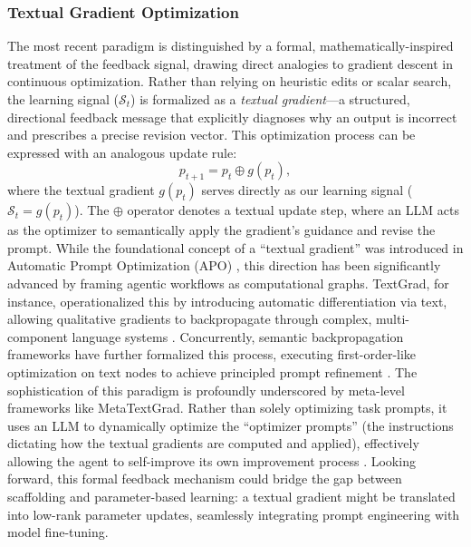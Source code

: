 \subsubsection{Textual Gradient Optimization}
\label{sec:Textual_Gradient_Optimization}
The most recent paradigm is distinguished by a formal, mathematically-inspired treatment of the feedback signal, drawing direct analogies to gradient descent in continuous optimization. Rather than relying on heuristic edits or scalar search, the learning signal ($\mathcal{S}_t$) is formalized as a \textit{textual gradient}—a structured, directional feedback message that explicitly diagnoses why an output is incorrect and prescribes a precise revision vector. This optimization process can be expressed with an analogous update rule:
\begin{equation}
p_{t+1} = p_t \oplus g(p_t),
\end{equation}
where the textual gradient $g(p_t)$ serves directly as our learning signal ($\mathcal{S}_t = g(p_t)$). The $\oplus$ operator denotes a textual update step, where an LLM acts as the optimizer to semantically apply the gradient's guidance and revise the prompt. While the foundational concept of a ``textual gradient'' was introduced in Automatic Prompt Optimization (APO) \citep{pryzant2023automaticpromptoptimizationgradient}, this direction has been significantly advanced by framing agentic workflows as computational graphs. TextGrad, for instance, operationalized this by introducing automatic differentiation via text, allowing qualitative gradients to backpropagate through complex, multi-component language systems \citep{yuksekgonul2024textgradautomaticdifferentiationtext}. Concurrently, semantic backpropagation frameworks have further formalized this process, executing first-order-like optimization on text nodes to achieve principled prompt refinement \citep{wang2024correctlysemanticbackpropagationlanguagebased}. The sophistication of this paradigm is profoundly underscored by meta-level frameworks like MetaTextGrad. Rather than solely optimizing task prompts, it uses an LLM to dynamically optimize the ``optimizer prompts'' (the instructions dictating how the textual gradients are computed and applied), effectively allowing the agent to self-improve its own improvement process \citep{xu2025metatextgradautomaticallyoptimizinglanguage}. Looking forward, this formal feedback mechanism could bridge the gap between scaffolding and parameter-based learning: a textual gradient might  be translated into low-rank parameter updates, seamlessly integrating prompt engineering with model fine-tuning.

